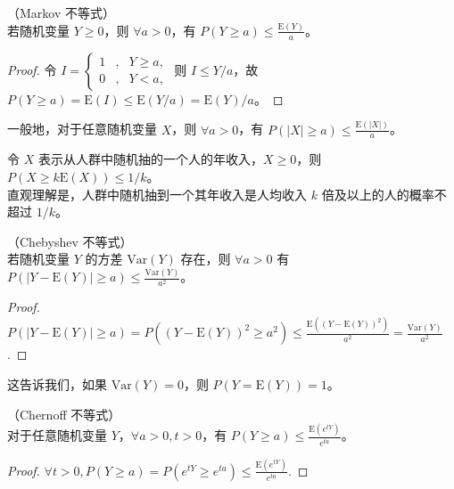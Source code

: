 \documentclass[../main.tex]{subfiles}
\begin{document}
\begin{theorem}\label{thm:5.1.1}
    （Markov 不等式）\\
    若随机变量 $Y\geq 0$，则 $\forall a>0$，有 $P(Y\geq a)\leq \frac{\mathrm E(Y)}a$。
\end{theorem}

\begin{proof}
    令 $I=\left\{
        \begin{aligned}
            1 & , & Y\geq a, \\
            0 & , & Y<a,
        \end{aligned}\right.$
    则 $I\leq Y/a$，故 $P(Y\geq a)=\mathrm E(I)\leq \mathrm E(Y/a)=\mathrm E(Y)/a$。
\end{proof}

一般地，对于任意随机变量 $X$，则 $\forall a>0$，有 $P(|X|\geq a)\leq\frac{\mathrm E(|X|)}a$。

\begin{example}
    令 $X$ 表示从人群中随机抽的一个人的年收入，$X\geq 0$，则 $P(X\geq k\mathrm E(X))\leq 1/k$。\\
    直观理解是，人群中随机抽到一个其年收入是人均收入 $k$ 倍及以上的人的概率不超过 $1/k$。
\end{example}

\begin{theorem}\label{thm:5.1.2}
    （Chebyshev 不等式）\\
    若随机变量 $Y$ 的方差 $\mathrm{Var}(Y)$ 存在，则 $\forall a>0$ 有 $P(|Y-\mathrm E(Y)|\geq a)\leq \frac{\mathrm{Var}(Y)}{a^2}$。
\end{theorem}

\begin{proof}
    $P(|Y-\mathrm E(Y)|\geq a)=P((Y-\mathrm E(Y))^2\geq a^2)\leq \frac{\mathrm E((Y-\mathrm E(Y))^2)}{a^2}=\frac{\mathrm{Var}(Y)}{a^2}$.
\end{proof}

这告诉我们，如果 $\mathrm{Var}(Y)=0$，则 $P(Y=\mathrm E(Y))=1$。

\begin{theorem}\label{thm:5.1.3}
    （Chernoff 不等式）\\
    对于任意随机变量 $Y$，$\forall a>0,t>0$，有 $P(Y\geq a)\leq\frac{\mathrm E(e^{tY})}{e^{ta}}$。
\end{theorem}

\begin{proof}
    $\forall t>0,P(Y\geq a)=P(e^{tY}\geq e^{ta})\leq\frac{\mathrm E(e^{tY})}{e^{ta}}.$
\end{proof}
\end{document}
